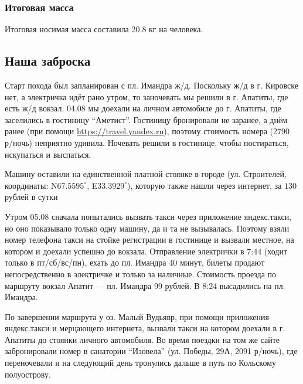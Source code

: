 \subsubsection{Итоговая масса}
Итоговая носимая масса составила 20.8 кг на человека.

\subsection{Наша заброска}
Старт похода был запланирован с пл. Имандра ж/д. Поскольку ж/д в г. Кировске нет, а электричка идёт рано утром,
то заночевать мы решили в г. Апатиты, где есть ж/д вокзал. 04.08 мы доехали на личном автомобиле до г. Апатиты,
где заселились в гостиницу \enquote{Аметист}. Гостиницу бронировали не заранее, а днём ранее
(при помощи \url{https://travel.yandex.ru}), поэтому стоимость номера (2790 р/ночь) неприятно удивила.
Ночевать решили в гостинице, чтобы постираться, искупаться и выспаться.

Машину оставили на единственной платной стоянке в городе (ул. Строителей, координаты:
N$67.5595^{\circ}$, E$33.3929^{\circ}$),
которую также нашли через интернет, за $130$ рублей в сутки

Утром 05.08 сначала попытались вызвать такси через приложение яндекс.такси, но оно показывало только одну машину,
да и та не вызывалась. Поэтому взяли номер телефона такси на стойке регистрации в гостинице и вызвали местное,
на котором и доехали успешно до вокзала. Отправление электрички в 7:44 (ходит только в пт/сб/вс/пн),
ехать до пл. Имандра 40 минут, билеты продают непосредственно в электричке и только за наличные.
Стоимость проезда по маршруту вокзал Апатит --- пл. Имандра 99 рублей. В 8:24 высадились на пл. Имандра.

По завершении маршрута у оз. Малый Вудьявр, при помощи приложения яндекс.такси и мерцающего интернета,
вызвали такси на котором доехали в г. Апатиты до стоянки личного автомобиля.
Во время поездки на том же сайте забронировали номер в санатории \enquote{Изовела} (ул. Победы, 29А, 2091 р/ночь),
где переночевали и на следующий день тронулись дальше в путь по Кольскому полуострову.
